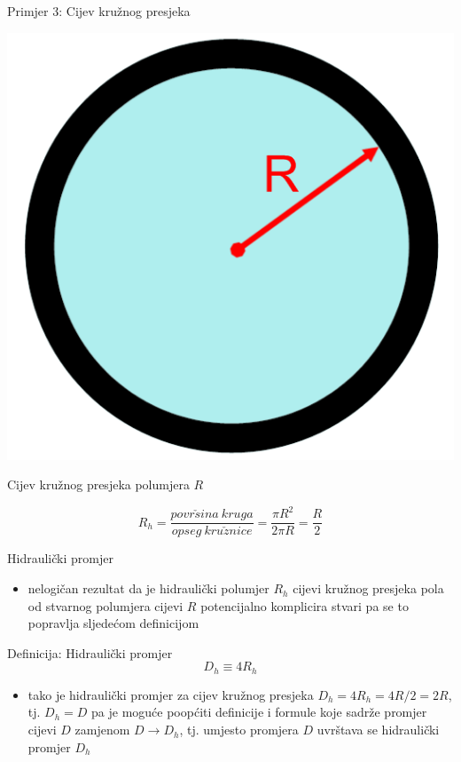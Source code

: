 \documentclass[croatian]{beamer}
\begin{document}
\begin{frame}{Primjer 3: Cijev kružnog presjeka}

\begin{center}
\includegraphics[width=0.3\paperwidth]{slike/slika5.PNG}
\par\end{center}
\begin{example}
{Cijev kružnog presjeka polumjera $R$}

\[
R_{h}=\frac{povr\check{s}ina\:kruga}{opseg\:kru\check{z}nice}=\frac{\pi R^{2}}{2\pi R}=\frac{R}{2}
\]

\end{example}

\end{frame}

\begin{frame}{Hidraulički promjer}

\begin{itemize}
\item nelogičan rezultat da je hidraulički polumjer $R_{h}$ cijevi kružnog
presjeka pola od stvarnog polumjera cijevi $R$ potencijalno komplicira
stvari pa se to popravlja sljedećom definicijom
\end{itemize}
\begin{alertblock}{Definicija: Hidraulički promjer}
\[
D_{h}\equiv4R_{h}
\]
\end{alertblock}
\begin{itemize}
\item tako je hidraulički promjer za cijev kružnog presjeka $D_{h}=4R_{h}=4R/2=2R$,
tj. $D_{h}=D$ pa je moguće poopćiti definicije i formule koje sadrže
promjer cijevi $D$ zamjenom $D\rightarrow D_{h}$, tj. umjesto promjera
$D$ uvrštava se hidraulički promjer $D_{h}$
\end{itemize}
\end{frame}
\end{document}
